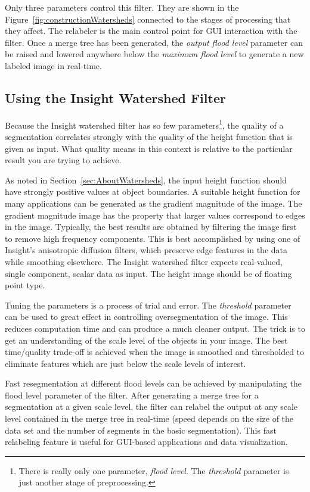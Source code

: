 Only three parameters control this filter.  They are shown in the
Figure~\ref{fig:constructionWatersheds} connected to the stages of processing
that they affect.  The relabeler is the main control point for GUI
interaction with the filter.  Once a merge tree has been generated, the {\em
output flood level} parameter can be raised and lowered anywhere below the {\em
maximum flood level} to generate a new labeled image in real-time.

\subsection{Using the Insight Watershed Filter}
\label{sec:UsingWatersheds}
Because the Insight watershed filter has so few parameters\footnote{There is
really only one parameter, \emph{flood level}.  The \emph{threshold} parameter
is just another stage of preprocessing.}, the quality of a segmentation
correlates strongly with the quality of the height function that is given as
input. What quality means in this context is relative to the particular result
you are trying to achieve.

As noted in Section~\ref{sec:AboutWatersheds}, the input height function
should have strongly positive values at object boundaries.  A suitable height
function for many applications can be generated as the gradient magnitude of
the image.  The gradient magnitude image has the property that larger values
correspond to edges in the image.  Typically, the best results are obtained by
filtering the image first to remove high frequency components.  This is best
accomplished by using one of Insight's anisotropic diffusion filters, which
preserve edge features in the data while smoothing elsewhere.  The Insight
watershed filter expects real-valued, single component, scalar data as input.
The height image should be of floating point type.

Tuning the parameters is a process of trial and error.  The {\em threshold}
parameter can be used to great effect in controlling oversegmentation of the
image.  This reduces computation time and can produce a much cleaner output.
The trick is to get an understanding of the scale level of the objects in your
image.  The best time/quality trade-off is achieved when the image is smoothed
and thresholded to eliminate features which are just below the scale levels of
interest.

Fast resegmentation at different flood levels can be achieved by manipulating
the flood level parameter of the filter.  After generating a merge tree for a
segmentation at a given scale level, the filter can relabel the output at any
scale level contained in the merge tree in real-time (speed depends on the size
of the data set and the number of segments in the basic segmentation).  This
fast relabeling feature is useful for GUI-based applications and data
visualization.

